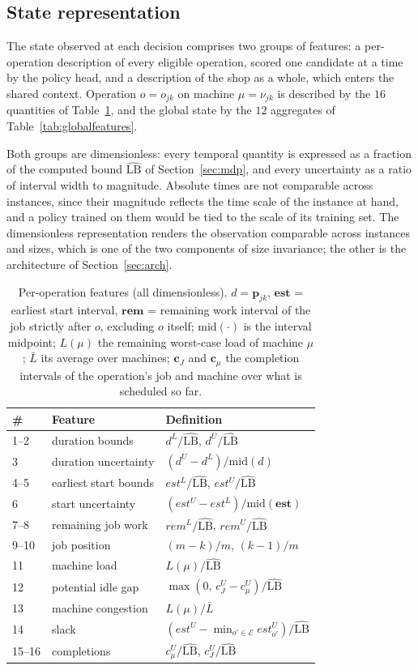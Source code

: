 \documentclass[preprint,12pt]{elsarticle}
\newcommand{\LBi}{\widehat{\mathrm{LB}}}
\theoremstyle{definition}
\theoremstyle{remark}
\begin{document}
\subsection{State representation}
\label{sec:features}

The state observed at each decision comprises two groups of
features: a per-operation description of every eligible operation,
scored one candidate at a time by the policy head, and a description
of the shop as a whole, which enters the shared context. Operation
$o=o_{jk}$ on machine $\mu=\nu_{jk}$ is described by the $16$
quantities of Table~\ref{tab:opfeatures}, and the global state by the
$12$ aggregates of Table~\ref{tab:globalfeatures}.

Both groups are dimensionless: every temporal quantity is expressed
as a fraction of the computed bound $\LBi$ of Section~\ref{sec:mdp},
and every uncertainty as a ratio of interval width to magnitude.
Absolute times are not comparable across instances, since their
magnitude reflects the time scale of the instance at hand, and a
policy trained on them would be tied to the scale of its training
set. The dimensionless representation renders the observation
comparable across instances and sizes, which is one of the two
components of size invariance; the other is the architecture of
Section~\ref{sec:arch}.

\begin{table}[!htb]
\centering\small
\caption{Per-operation features (all dimensionless). $d=\mathbf{p}_{jk}$,
$\mathbf{est}$ = earliest start interval, $\mathbf{rem}$ = remaining work
interval of the job strictly after $o$, excluding $o$ itself;
$\mathrm{mid}(\cdot)$ is the interval
midpoint; $L(\mu)$ the remaining worst-case load of machine $\mu$;
$\bar L$ its average over machines; $\mathbf{c}_{J}$ and
$\mathbf{c}_{\mu}$ the completion intervals of the operation's job
and machine over what is scheduled so far.}
\label{tab:opfeatures}
\begin{tabular*}{\textwidth}{@{\extracolsep{\fill}}lll}
\toprule
\# & Feature & Definition \\
\midrule
1--2 & duration bounds & $d^L/\LBi$, $d^U/\LBi$ \\
3 & duration uncertainty & $(d^U-d^L)/\mathrm{mid}(d)$ \\
4--5 & earliest start bounds & $est^L/\LBi$, $est^U/\LBi$ \\
6 & start uncertainty & $(est^U-est^L)/\mathrm{mid}(\mathbf{est})$ \\
7--8 & remaining job work & $rem^L/\LBi$, $rem^U/\LBi$ \\
9--10 & job position & $(m-k)/m$, $(k-1)/m$ \\
11 & machine load & $L(\mu)/\LBi$ \\
12 & potential idle gap & $\max(0,\,c^U_{J}-c^U_{\mu})/\LBi$ \\
13 & machine congestion & $L(\mu)/\bar L$ \\
14 & slack & $(est^U-\min_{o'\in\mathcal{E}}est^U_{o'})/\LBi$ \\
15--16 & completions & $c^U_{\mu}/\LBi$, $c^U_{J}/\LBi$ \\
\bottomrule
\end{tabular*}
\end{table}
\end{document}
